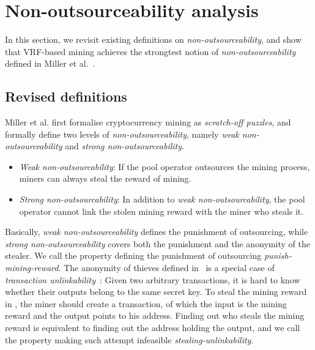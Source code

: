 \section{Non-outsourceability analysis}
\label{sec:non_outsourceability}

In this section, we revisit existing definitions on \emph{non-outsourceability}, and show that VRF-based mining achieves the strongtest notion of \emph{non-outsourceability} defined in Miller et al.~\cite{miller2015nonoutsourceable}.

\subsection{Revised definitions}

Miller et al. \cite{miller2015nonoutsourceable} first formalise cryptocurrency mining as \emph{scratch-off puzzles}, and formally define two levels of \emph{non-outsourceability}, namely \emph{weak non-outsourceability} and \emph{strong non-outsourceability}.

\begin{itemize}
    \item \emph{Weak non-outsourcability}: If the pool operator outsources the mining process, miners can always steal the reward of mining.
    \item \emph{Strong non-outsourcability}: In addition to \emph{weak non-outsourcability}, the pool operator cannot link the stolen mining reward with the miner who steals it.
\end{itemize}

Basically, \emph{weak non-outsourceability} defines the punishment of outsourcing, while \emph{strong non-outsourceability} covers both the punishment and the anonymity of the stealer.
We call the property defining the punishment of outsourcing \emph{punish-mining-reward}.
The anonymity of thieves defined in~\cite{miller2015nonoutsourceable} is a special case of \emph{transaction unlinkability}~\cite{van2013cryptonote}: Given two arbitrary transactions, it is hard to know whether their outputs belong to the same secret key.
To steal the mining reward in \cite{miller2015nonoutsourceable}, the miner should create a transaction, of which the input is the mining reward and the output points to his address.
Finding out who steals the mining reward is equivalent to finding out the address holding the output, and we call the property making such attempt infeasible \emph{stealing-unlinkability}.




